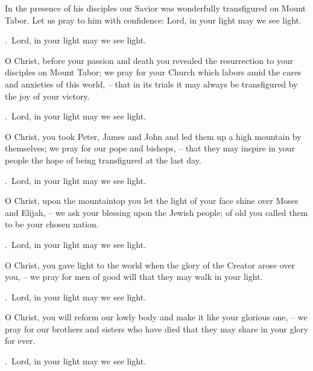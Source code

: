 \lettrine[loversize=0.15,lines=2]{I}{}n the presence of his disciples our Savior was wonderfully transfigured on Mount Tabor.  Let us pray to him with confidence: Lord, in your light may we see light.
\par \Rbar.~Lord, in your light may we see light.

O Christ, before your passion and death you revealed the resurrection to your disciples on Mount Tabor; we pray for your Church which labors amid the cares and anxieties of this world,
– that in its trials it may always be transfigured by the joy of your victory.
\par \Rbar.~Lord, in your light may we see light.

O Christ, you took Peter, James and John and led them up a high mountain by themselves; we pray for our pope and bishops,
– that they may inspire in your people the hope of being transfigured at the last day.
\par \Rbar.~Lord, in your light may we see light.

O Christ, upon the mountaintop you let the light of your face shine over Moses and Elijah,
– we ask your blessing upon the Jewish people; of old you called them to be your chosen nation.
\par \Rbar.~Lord, in your light may we see light.

O Christ, you gave light to the world when the glory of the Creator arose over you,
– we pray for men of good will that they may walk in your light.
\par \Rbar.~Lord, in your light may we see light.

O Christ, you will reform our lowly body and make it like your glorious one,
– we pray for our brothers and sisters who have died that they may share in your glory for ever.
\par \Rbar.~Lord, in your light may we see light.
